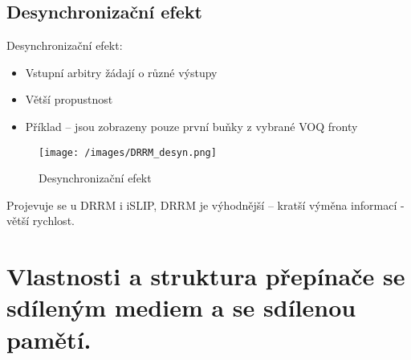 \subsection{Desynchronizační efekt}
Desynchronizační efekt:
\begin{itemize}
    \item Vstupní arbitry žádají o různé výstupy
    \item Větší propustnost
    \item Příklad -- jsou zobrazeny pouze první buňky z vybrané VOQ fronty
\end{itemize}
\begin{figure}[ht]
\centering
  \begin{center}
    \texttt{[image: /images/DRRM\_desyn.png]}
  \end{center}
  \caption[Desynchronizační efekt]{Desynchronizační efekt}
\end{figure}
Projevuje se u DRRM i iSLIP, DRRM je výhodnější -- kratší výměna informací - větší rychlost.

\newpage
\section{Vlastnosti a struktura přepínače se sdíleným mediem a se sdílenou pamětí.}
